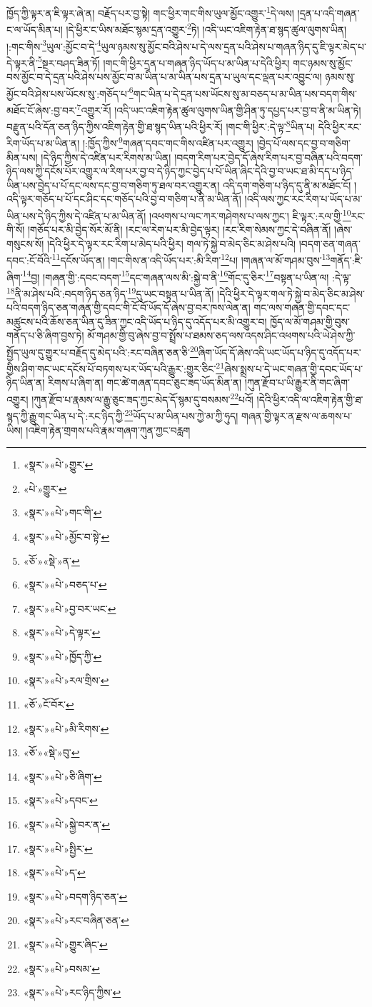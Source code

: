 ཁྱོད་ཀྱི་ལྟར་ན་ཇི་ལྟར་ཞེ་ན། བརྗོད་པར་བྱ་སྟེ། གང་ཕྱིར་གང་གིས་ཡུལ་མྱོང་འགྱུར་\footnote{«སྣར་»«པེ་»གྱུར་}དེ་ལས། །དྲན་པ་འདི་གཞན་ང་ལ་ཡོད་མིན་པ། །དེ་ཕྱིར་ང་ཡིས་མཐོང་སྙམ་དྲན་འགྱུར་\footnote{«པེ་»གྱུར་}ཏེ། །འདི་ཡང་འཇིག་རྟེན་ཐ་སྙད་ཚུལ་ལུགས་ཡིན། །:གང་གིས་\footnote{«སྣར་»«པེ་»གང་གི་}ཡུལ་:མྱོང་བ་དེ་\footnote{«སྣར་»«པེ་»མྱོང་བ་སྟེ་}ཡུལ་ཉམས་སུ་མྱོང་བའི་ཤེས་པ་དེ་ལས་དྲན་པའི་ཤེས་པ་གཞན་ཉིད་དུ་ཇི་ལྟར་མེད་པ་དེ་ལྟར་ནི་\footnote{«ཅོ་»«སྡེ་»ན་}སྔར་བཤད་ཟིན་ཏོ། །གང་གི་ཕྱིར་དྲན་པ་གཞན་ཉིད་ཡོད་པ་མ་ཡིན་པ་དེའི་ཕྱིར། གང་ཉམས་སུ་མྱོང་བས་མྱོང་བ་དེ་དྲན་པའི་ཤེས་པས་མྱོང་བ་མ་ཡིན་པ་མ་ཡིན་པས་དྲན་པ་ཡུལ་དང་ལྡན་པར་འབྱུང་ལ། ཉམས་སུ་མྱོང་བའི་ཤེས་པས་ཡོངས་སུ་:གཅོད་པ་\footnote{«སྣར་»«པེ་»བཅད་པ་}གང་ཡིན་པ་དེ་དྲན་པས་ཡོངས་སུ་མ་བཅད་པ་མ་ཡིན་པས་བདག་གིས་མཐོང་ངོ་ཞེས་:བྱ་བར་\footnote{«སྣར་»«པེ་»བྱ་བར་ཡང་}འགྱུར་རོ། །འདི་ཡང་འཇིག་རྟེན་ཚུལ་ལུགས་ཡིན་གྱི་ཤིན་ཏུ་དཔྱད་པར་བྱ་བ་ནི་མ་ཡིན་ཏེ། བརྫུན་པའི་དོན་ཅན་ཉིད་ཀྱིས་འཇིག་རྟེན་གྱི་ཐ་སྙད་ཡིན་པའི་ཕྱིར་རོ། །གང་གི་ཕྱིར་:དེ་ལྟ་\footnote{«སྣར་»«པེ་»དེ་ལྟར་}ཡིན་པ། དེའི་ཕྱིར་རང་རིག་ཡོད་པ་མ་ཡིན་ན། །:ཁྱོད་ཀྱིས་\footnote{«སྣར་»«པེ་»ཁྱོད་ཀྱི་}གཞན་དབང་གང་གིས་འཛིན་པར་འགྱུར། །བྱེད་པོ་ལས་དང་བྱ་བ་གཅིག་མིན་པས། །དེ་ཉིད་ཀྱིས་དེ་འཛིན་པར་རིགས་མ་ཡིན། །བདག་རིག་པར་བྱེད་དོ་ཞེས་རིག་པར་བྱ་བཞིན་པའི་བདག་ཉིད་ལས་ཀྱི་དངོས་པོར་འགྱུར་ལ་རིག་པར་བྱ་བ་དེ་ཉིད་ཀྱང་བྱེད་པ་པོ་ཡིན་ཞིང་དེའི་བྱ་བ་ཡང་ཐ་མི་དད་པ་ཉིད་ཡིན་པས་བྱེད་པ་པོ་དང་ལས་དང་བྱ་བ་གཅིག་ཏུ་ཐལ་བར་འགྱུར་ན། འདི་དག་གཅིག་པ་ཉིད་དུ་ནི་མ་མཐོང་ངོ། །འདི་ལྟར་གཅོད་པ་པོ་དང་ཤིང་དང་གཅོད་པའི་བྱ་བ་གཅིག་པ་ནི་མ་ཡིན་ནོ། །འདི་ལས་ཀྱང་རང་རིག་པ་ཡོད་པ་མ་ཡིན་པས་དེ་ཉིད་ཀྱིས་དེ་འཛིན་པ་མ་ཡིན་ནོ། །འཕགས་པ་ལང་ཀར་གཤེགས་པ་ལས་ཀྱང་། ཇི་ལྟར་:རལ་གྱི་\footnote{«སྣར་»«པེ་»རལ་གྲིས་}རང་གི་སོ། །གཅོད་པར་མི་བྱེད་སོར་མོ་ནི། །རང་ལ་རེག་པར་མི་བྱེད་ལྟར། །རང་རིག་སེམས་ཀྱང་དེ་བཞིན་ནོ། །ཞེས་གསུངས་སོ། །དེའི་ཕྱིར་དེ་ལྟར་རང་རིག་པ་མེད་པའི་ཕྱིར། གལ་ཏེ་སྐྱེ་བ་མེད་ཅིང་མ་ཤེས་པའི། །བདག་ཅན་གཞན་དབང་:ངོ་བོའི་\footnote{«ཅོ་»ངོ་བོར་}དངོས་ཡོད་ན། །གང་གིས་ན་འདི་ཡོད་པར་:མི་རིག་\footnote{«སྣར་»«པེ་»མི་རིགས་}པ། །གཞན་ལ་མོ་གཤམ་བུས་\footnote{«ཅོ་»«སྡེ་»བུ་}གནོད་:ཇི་ཞིག་\footnote{«སྣར་»«པེ་»ཅི་ཞིག་}བྱ། །གཞན་གྱི་:དབང་བདག་\footnote{«སྣར་»«པེ་»དབང་}དང་གཞན་ལས་མི་:སྐྱེ་བ་ནི་\footnote{«སྣར་»«པེ་»སྐྱེ་བར་ན་}གོང་དུ་ཅིར་\footnote{«སྣར་»«པེ་»སྤྱིར་}བསྟན་པ་ཡིན་ལ། :དེ་ལྟ་\footnote{«སྣར་»«པེ་»ད་}ནི་མ་ཤེས་པའི་:བདག་ཉིད་ཅན་ཉིད་\footnote{«སྣར་»«པེ་»བདག་ཉིད་ཅན་}དུ་ཡང་བསྟན་པ་ཡིན་ནོ། །དེའི་ཕྱིར་དེ་ལྟར་གལ་ཏེ་སྐྱེ་བ་མེད་ཅིང་མ་ཤེས་པའི་བདག་ཉིད་ཅན་གཞན་གྱི་དབང་གི་ངོ་བོ་ཡོད་དོ་ཞེས་བྱ་བར་ཁས་ལེན་ན། གང་ལས་གཞན་གྱི་དབང་དང་མཚུངས་པའི་ཆོས་ཅན་ཡིན་དུ་ཟིན་ཀྱང་འདི་ཡོད་པ་ཉིད་དུ་འདོད་པར་མི་འགྱུར་བ། ཁྱོད་ལ་མོ་གཤམ་གྱི་བུས་གནོད་པ་ཅི་ཞིག་བྱས་ཏེ། མོ་གཤམ་གྱི་བུ་ཞེས་བྱ་བ་སྤྲོས་པ་ཐམས་ཅད་ལས་འདས་ཤིང་འཕགས་པའི་ཡེ་ཤེས་ཀྱི་སྤྱོད་ཡུལ་དུ་གྱུར་པ་བརྗོད་དུ་མེད་པའི་:རང་བཞིན་ཅན་ཅི་\footnote{«སྣར་»«པེ་»རང་བཞིན་ཅན་}ཞིག་ཡོད་དོ་ཞེས་འདི་ཡང་ཡོད་པ་ཉིད་དུ་འདོད་པར་གྱིས་ཤིག་གང་ཡང་དངོས་པོ་བཏགས་པར་ཡོད་པའི་རྒྱུར་:གྱུར་ཅིང་\footnote{«སྣར་»«པེ་»གྱུར་ཞིང་}ཞེས་སྨྲས་པ་དེ་ཡང་གཞན་གྱི་དབང་ཡོད་པ་ཉིད་ཡིན་ན། རིགས་པ་ཞིག་ན། གང་ཚེ་གཞན་དབང་ཅུང་ཟད་ཡོད་མིན་ན། །ཀུན་རྫོབ་པ་ཡི་རྒྱུར་ནི་གང་ཞིག་འགྱུར། །ཀུན་རྫོབ་པ་རྣམས་ལ་རྒྱུ་ཅུང་ཟད་ཀྱང་མེད་དོ་སྙམ་དུ་བསམས་\footnote{«སྣར་»«པེ་»བསམ་}པའོ། །དེའི་ཕྱིར་འདི་ལ་འཇིག་རྟེན་གྱི་ཐ་སྙད་ཀྱི་རྒྱུ་གང་ཡིན་པ་དེ་:རང་ཉིད་ཀྱི་\footnote{«སྣར་»«པེ་»རང་ཉིད་ཀྱིས་}ཡོད་པ་མ་ཡིན་པས་ཀྱེ་མ་ཀྱི་ཧུད། གཞན་གྱི་ལྟར་ན་རྫས་ལ་ཆགས་པ་ཡིས། །འཇིག་རྟེན་གྲགས་པའི་རྣམ་གཞག་ཀུན་ཀྱང་བརླག 